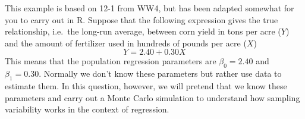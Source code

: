 \documentclass[addpoints,12pt]{exam}\usepackage[]{graphicx}\usepackage[]{color}
\makeatletter
\newcommand{\hlnum}[1]{\textcolor[rgb]{0.686,0.059,0.569}{#1}}%
\newcommand{\hlopt}[1]{\textcolor[rgb]{0,0,0}{#1}}%
\newcommand{\hlstd}[1]{\textcolor[rgb]{0.345,0.345,0.345}{#1}}%
\newcommand{\hlkwa}[1]{\textcolor[rgb]{0.161,0.373,0.58}{\textbf{#1}}}%
\newcommand{\hlkwb}[1]{\textcolor[rgb]{0.69,0.353,0.396}{#1}}%
\newcommand{\hlkwc}[1]{\textcolor[rgb]{0.333,0.667,0.333}{#1}}%
\newcommand{\hlkwd}[1]{\textcolor[rgb]{0.737,0.353,0.396}{\textbf{#1}}}%
\newenvironment{kframe}{%
 \def\at@end@of@kframe{}%
 \ifinner\ifhmode%
  \def\at@end@of@kframe{\end{minipage}}%
  \begin{minipage}{\columnwidth}%
 \fi\fi%
 \def\FrameCommand##1{\hskip\@totalleftmargin \hskip-\fboxsep
 \colorbox{shadecolor}{##1}\hskip-\fboxsep
     \hskip-\linewidth \hskip-\@totalleftmargin \hskip\columnwidth}%
 \MakeFramed {\advance\hsize-\width
   \@totalleftmargin\z@ \linewidth\hsize
   \@setminipage}}%
 {\par\unskip\endMakeFramed%
 \at@end@of@kframe}
\newenvironment{knitrout}{}{} %
\makeatother
\begin{document}
\begin{questions}


	\question This example is based on 12-1 from WW4, but has been adapted somewhat for you to carry out in R. Suppose that the following expression gives the true relationship, i.e.\ the long-run average, between corn yield in tons per acre ($Y$) and the amount of fertilizer used in hundreds of pounds per acre ($X$)
		$$Y = 2.40 + 0.30 X$$
This means that the population regression parameters are $\beta_0 = 2.40$ and $\beta_1 = 0.30$. Normally we don't know these parameters but rather use data to estimate them. In this question, however, we will pretend that we know these parameters and carry out a Monte Carlo simulation to understand how sampling variability works in the context of regression.
\end{questions}
\end{document}

